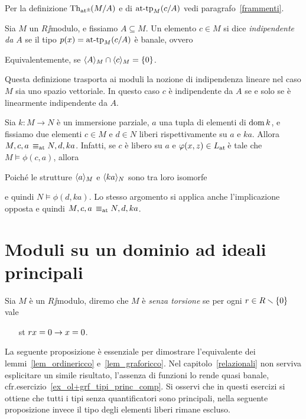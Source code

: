 Per la definizione $\textrm{Th}_{{\tiny\rm at^\pm}}\hskip-.3ex(M/A)$ e di $\textrm{at\mbox{-}tp}_M(c/A)$ vedi paragrafo~\ref{frammenti}.

\begin{definition} Sia $M$ un $R\jj$modulo, e fissiamo $A\subseteq M$. Un elemento $c\in M$ si dice \emph{indipendente da $A$\/} se il tipo $p(x)=\textrm{at\mbox{-}tp}_M(c/A)$ \`e banale, ovvero


Equivalentemente, se $\langle A\rangle_M\cap\langle c\rangle_M=\{0\}$.\QED
\end{definition}  

Questa definizione trasporta ai moduli la nozione di indipendenza lineare nel caso $M$ sia uno spazio vettoriale. In questo caso $c$ \`e indipendente da $A$ se e solo se \`e linearmente indipendente da $A$.

\begin{remark}\label{oss_liberi_qf}
Sia $k:M\to N$ \`e un immersione parziale, $a$ una tupla di elementi di $\mathop{\rm dom} k$, e fissiamo due elementi $c\in M$ e $d\in N$ liberi rispettivamente su $a$ e $ka$. Allora $M,c,a\,\equiv_{\rm at}N,d,ka$. Infatti, se $c$ \`e libero su $a$ e $\varphi(x,z)\in L_{\tiny\rm at}\hskip-.3ex$ \`e tale che $M\models\phi(c,a)$, allora 


Poich\'e le strutture $\langle a\rangle_M$ e  $\langle ka\rangle_N$ sono tra loro isomorfe 


e quindi $N\models\phi(d,ka)$. Lo stesso argomento si applica anche l'implicazione opposta e quindi $M,c,a\,\equiv_{\rm at}N,d,ka$.\QED 
\end{remark}

\section{Moduli su un dominio ad ideali principali}

Sia $M$ \`e un $R\jj$modulo, diremo che $M$ \`e \emph{senza torsione\/} se per ogni  $r\in R\smallsetminus \{0\}$ vale
\begin{itemize}
\item[st] $rx= 0\rightarrow x=0$.
\end{itemize}

La seguente proposizione \`e essenziale per dimostrare l'equivalente dei lemmi~\ref{lem_ordinericco} e~\ref{lem_graforicco}. Nel capitolo~\ref{relazionali} non serviva esplicitare un simile risultato, l'assenza di funzioni lo rende quasi banale, cfr.\@  esercizio~\ref{ex_ol+grf_tipi_princ_comp}. Si osservi che in questi esercizi si ottiene che tutti i tipi senza quantificatori sono principali, nella seguente proposizione invece il tipo degli elementi liberi rimane escluso.

